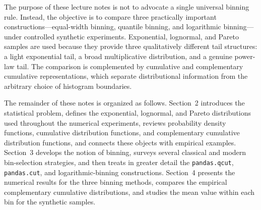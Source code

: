 The purpose of these lecture notes is not to advocate a single universal binning rule. Instead, the objective is to compare three practically important constructions---equal-width binning, quantile binning, and logarithmic binning---under controlled synthetic experiments. Exponential, lognormal, and Pareto samples are used because they provide three qualitatively different tail structures: a light exponential tail, a broad multiplicative distribution, and a genuine power-law tail. The comparison is complemented by cumulative and complementary cumulative representations, which separate distributional information from the arbitrary choice of histogram boundaries.

The remainder of these notes is organized as follows. Section~2 introduces the statistical problem, defines the exponential, lognormal, and Pareto distributions used throughout the numerical experiments, reviews probability density functions, cumulative distribution functions, and complementary cumulative distribution functions, and connects these objects with empirical examples. Section~3 develops the notion of binning, surveys several classical and modern bin-selection strategies, and then treats in greater detail the \texttt{pandas.qcut}, \texttt{pandas.cut}, and logarithmic-binning constructions. Section~4 presents the numerical results for the three binning methods, compares the empirical complementary cumulative distributions, and studies the mean value within each bin for the synthetic samples.

